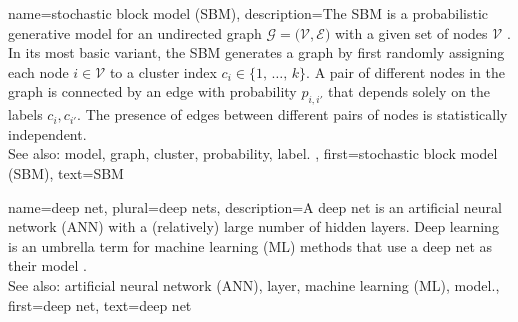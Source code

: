 {
{name={stochastic block model (SBM)},
	description={The SBM is a 
		probabilistic generative model for an undirected graph $\mathcal{G} = \big( \mathcal{V}, \mathcal{E} \big)$ 
		with a given set of nodes $\mathcal{V}$ \cite{AbbeSBM2018}. In its most basic variant, 
		the SBM generates a graph by first randomly assigning each node $i \in \mathcal{V}$ to 
		a cluster index $c_{i} \in \{1, \,\ldots, \,k\}$. A pair of different nodes in the 
		graph is connected by an edge with probability $p_{i,i'}$ that depends 
		solely on the labels $c_{i}, c_{i'}$. 
		The presence of edges between different pairs of 
		nodes is statistically independent.
					\\ 
		See also: model, graph, cluster, probability, label. },
	first={stochastic block model (SBM)},
	text={SBM} 
}

{name={deep net}, plural={deep nets},
	description={A deep net is an artificial neural network (ANN) with a (relatively) large number of 
		hidden layers. Deep learning is an umbrella term for machine learning (ML) methods that use a deep 
		net as their model \cite{Goodfellow-et-al-2016}.
				\\ 
		See also: artificial neural network (ANN), layer, machine learning (ML), model.},
	first={deep net},
	text={deep net} 
}



}

